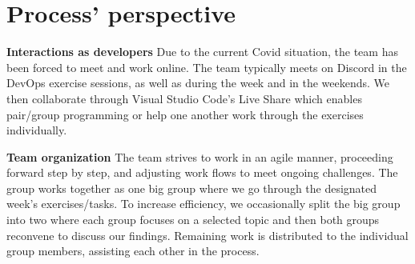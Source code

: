\section{Process' perspective}

\textbf{Interactions as developers}\newline
  Due to the current Covid situation, the team has been forced to meet and work online. The team typically meets on Discord in the DevOps
  exercise sessions, as well as during the week and in the weekends. We then collaborate through Visual Studio Code's Live Share which enables pair/group programming or help one another work through the exercises individually. 
  \newline
 
\textbf{Team organization}\newline
  The team strives to work in an agile manner, proceeding forward step by step, and adjusting work flows to meet ongoing challenges. The group works together as one big group where we go through the designated week's exercises/tasks. 
  To increase efficiency, we occasionally split the big group into two where each group focuses on a selected topic
  and then both groups reconvene to discuss our findings. Remaining work is distributed to the individual group members, assisting each other in the process.

